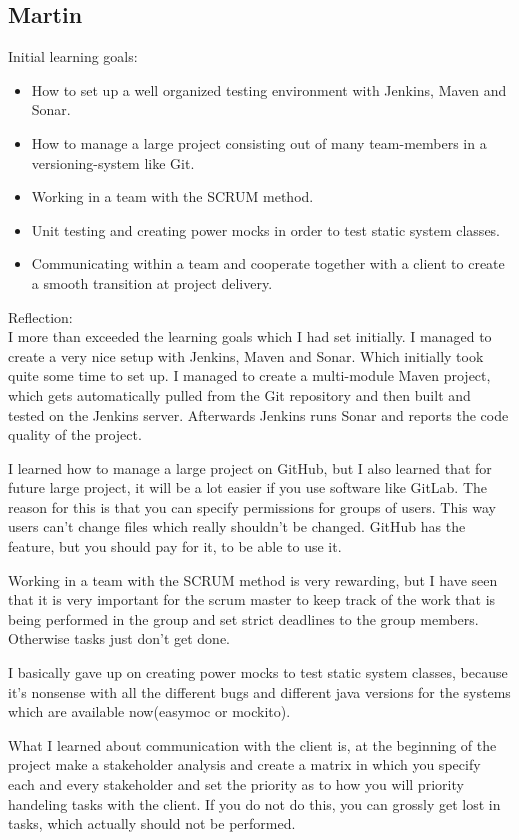 \documentclass{article}
\begin{document}
\begin{enumerate}
\begin{itemize}
\subsection*{Martin}
Initial learning goals:
\begin{itemize}
  \item How to set up a well organized testing environment with Jenkins, Maven and Sonar.
  \item How to manage a large project consisting out of many team-members in a versioning-system like Git.
  \item Working in a team with the SCRUM method.
  \item Unit testing and creating power mocks in order to test static system classes.
  \item Communicating within a team and cooperate together with a client to create a smooth transition at project delivery.
\end{itemize}

Reflection: \\
I more than exceeded the learning goals which I had set initially. I managed
   to create a very nice setup with Jenkins, Maven and Sonar. Which initially
   took quite some time to set up. I managed to create a multi-module Maven
   project, which gets automatically pulled from the Git repository and then
   built and tested on the Jenkins server. Afterwards Jenkins runs Sonar and
   reports the code quality of the project.
 
   I learned how to manage a large project on GitHub, but I also learned that
   for future large project, it will be a lot easier if you use software like
   GitLab.  The reason for this is that you can specify permissions for groups
   of users.  This way users can't change files which really shouldn't be
   changed. GitHub has the feature, but you should pay for it, to be able to use
   it.
 
   Working in a team with the SCRUM method is very rewarding, but I have seen
   that it is very important for the scrum master to keep track of the work that
   is being performed in the group and set strict deadlines to the group
   members. Otherwise tasks just don't get done.
 
   I basically gave up on creating power mocks to test static system
   classes, because it's nonsense with all the different bugs and different java
   versions for the systems which are available now(easymoc or mockito).
 
   What I learned about communication with the client is, at the beginning of
   the project make a stakeholder analysis and create a matrix in which you
   specify each and every stakeholder and set the priority as to how you will
   priority handeling tasks with the client. If you do not do this, you can
   grossly get lost in tasks, which actually should not be performed.






\end{itemize}
\end{enumerate}
\end{document}
